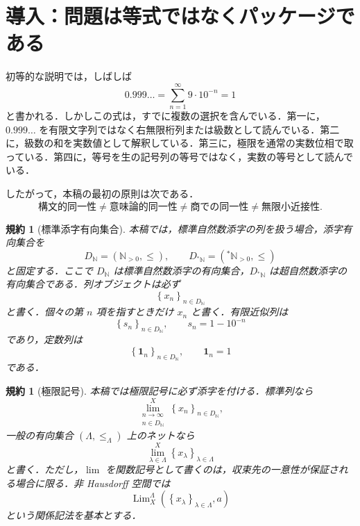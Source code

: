\documentclass[a4paper,11pt]{ltjsarticle}
\theoremstyle{jpdef}
\newtheorem{convention}[definition]{規約}
\theoremstyle{jpthm}
\newcommand{\N}{\mathbb{N}}
\newcommand{\Lim}{\operatorname{Lim}}
\newcommand{\Ns}{\N_{>0}}
\newcommand{\DN}{D_{\N}}
\newcommand{\DStarN}{D_{{}^{\ast}\N}}
\newcommand{\seq}[2]{\left\{#1\right\}_{#2}}
\newcommand{\net}[2]{\left\{#1_{\lambda}\right\}_{\lambda\in #2}}
\newcommand{\ulim}[1]{{}^{\ast}#1}
\begin{document}
\section{導入：問題は等式ではなくパッケージである}

初等的な説明では，しばしば
\[
 0.999\ldots=\sum_{n=1}^{\infty}9\cdot 10^{-n}=1
\]
と書かれる．しかしこの式は，すでに複数の選択を含んでいる．第一に，\(0.999\ldots\) を有限文字列ではなく右無限桁列または級数として読んでいる．第二に，級数の和を実数値として解釈している．第三に，極限を通常の実数位相で取っている．第四に，等号を生の記号列の等号ではなく，実数の等号として読んでいる．

したがって，本稿の最初の原則は次である．
\[
\text{構文的同一性}
\neq\text{意味論的同一性}
\neq\text{商での同一性}
\neq\text{無限小近接性}.
\]

\begin{convention}[標準添字有向集合]
本稿では，標準自然数添字の列を扱う場合，添字有向集合を
\[
  \DN=(\Ns,\le),\qquad \DStarN=(\ulim\Ns,\le)
\]
と固定する．ここで \(\DN\) は標準自然数添字の有向集合，\(\DStarN\) は超自然数添字の有向集合である．列オブジェクトは必ず
\[
  \seq{x_n}{n\in\DN}
\]
と書く．個々の第 \(n\) 項を指すときだけ \(x_n\) と書く．有限近似列は
\[
  \seq{s_n}{n\in\DN},\qquad s_n=1-10^{-n}
\]
であり，定数列は
\[
  \seq{\mathbf 1_n}{n\in\DN},\qquad \mathbf 1_n=1
\]
である．
\end{convention}

\begin{convention}[極限記号]
本稿では極限記号に必ず添字を付ける．標準列なら
\[
  \lim_{\substack{n\to\infty\\ n\in\DN}}^X\seq{x_n}{n\in\DN},
\]
一般の有向集合 \((\Lambda,\le_\Lambda)\) 上のネットなら
\[
  \lim_{\lambda\in\Lambda}^{X}\net{x}{\Lambda}
\]
と書く．ただし，\(\lim\) を関数記号として書くのは，収束先の一意性が保証される場合に限る．非 Hausdorff 空間では
\[
  \Lim_X^\Lambda(\net{x}{\Lambda},a)
\]
という関係記法を基本とする．
\end{convention}
\end{document}
